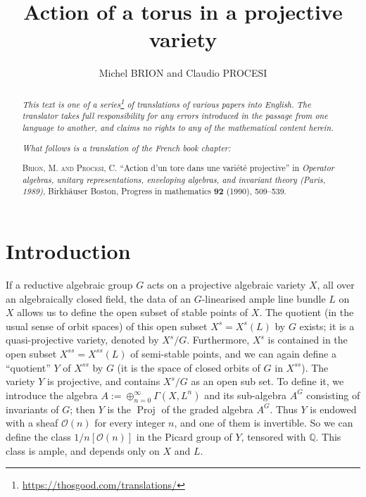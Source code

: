 \documentclass{article}
\title{Action of a torus in a projective variety}
\author{Michel BRION and Claudio PROCESI}
\date{}
\newcommand{\sh}{\mathscr}
\DeclareMathOperator{\Proj}{Proj}
\begin{document}
\maketitle
\thispagestyle{fancy}

\renewcommand{\abstractname}{Translator's note.}

\begin{abstract}
  \renewcommand*{\thefootnote}{\fnsymbol{footnote}}
  \emph{This text is one of a series\footnote{\url{https://thosgood.com/translations/}} of translations of various papers into English.}
  \emph{The translator takes full responsibility for any errors introduced in the passage from one language to another, and claims no rights to any of the mathematical content herein.}
  
  \emph{What follows is a translation of the French book chapter:}

  \medskip\noindent
  \textsc{Brion, M. and Procesi, C.}
  ``Action d'un tore dans une vari\'{e}t\'{e} projective''
  in \emph{Operator algebras, unitary representations, enveloping algebras, and invariant theory (Paris, 1989)}, Birkh\"{a}user Boston, Progress in mathematics \textbf{92} (1990), 509--539.
\end{abstract}

\setcounter{footnote}{0}

\tableofcontents
\bigskip



\section*{Introduction}
\label{introduction}

If a reductive algebraic group $G$ acts on a projective algebraic variety $X$, all over an algebraically closed field, the data of an $G$-linearised ample line bundle $L$ on $X$ allows us to define the open subset of stable points of $X$.
The quotient (in the usual sense of orbit spaces) of this open subset $X^s=X^s(L)$ by $G$ exists;
it is a quasi-projective variety, denoted by $X^s/G$.
Furthermore, $X^s$ is contained in the open subset $X^{ss}=X^{ss}(L)$ of semi-stable points, and we can again define a ``quotient'' $Y$ of $X^{ss}$ by $G$ (it is the space of closed orbits of $G$ in $X^{ss}$).
The variety $Y$ is projective, and contains $X^s/G$ as an open sub set.
To define it, we introduce the algebra $A:=\oplus_{n=0}^\infty \Gamma(X,L^n)$ and its sub-algebra $A^G$ consisting of invariants of $G$;
then $Y$ is the $\Proj$ of the graded algebra $A^G$.
Thus $Y$ is endowed with a sheaf $\sh{O}(n)$ for every integer $n$, and one of them is invertible.
So we can define the class $1/n[\sh{O}(n)]$ in the Picard group of $Y$, tensored with $\mathbb{Q}$.
This class is ample, and depends only on $X$ and $L$.
\end{document}
